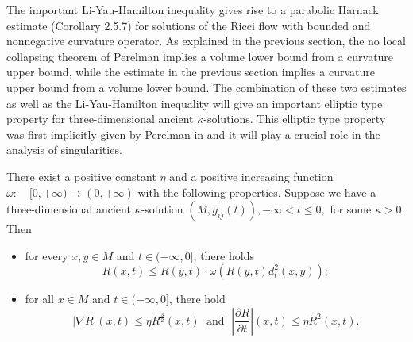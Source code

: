 The important Li-Yau-Hamilton inequality gives rise to a parabolic
Harnack estimate (Corollary 2.5.7) for solutions of the Ricci flow
with bounded and nonnegative curvature operator. As explained in
the previous section, the no local collapsing theorem of Perelman
implies a volume lower bound from a curvature upper bound, while
the estimate in the previous section implies a curvature upper
bound from a volume lower bound. The combination of these two
estimates as well as the Li-Yau-Hamilton inequality will give an
important elliptic type property for three-dimensional ancient
$\kappa$-solutions. This elliptic type property was first
implicitly given by Perelman in \cite{P1} and it will play a
crucial role in the analysis of singularities.

\begin{theorem}
  \label{thm:cz-ancient-kappa-elliptic-estimates}
 There exist a positive constant $\eta$ and a
positive increasing function $\omega:\quad [0,+\infty)\rightarrow
(0,+\infty)$ with the following properties. Suppose we have a
three-dimensional ancient $\kappa$-solution
$(M,g_{ij}(t)),-\infty<t\le 0,$ for some $\kappa>0$. Then
\begin{itemize}
\item[(i)]for every $x,y\in M$ and $t\in(-\infty,0]$, there holds
$$
R(x,t)\le R(y,t)\cdot \omega(R(y,t)d_t^2(x,y));
$$
\item[(ii)] for all $x\in M$ and $t\in (-\infty,0]$, there hold
$$
|\nabla R|(x,t)\le\eta R^\frac{3}{2}(x,t)\;  \mbox{ and }\;
\left|\frac{\partial R}{\partial t}\right|(x,t)\le \eta R^2(x,t).
$$
\end{itemize}
\end{theorem}

